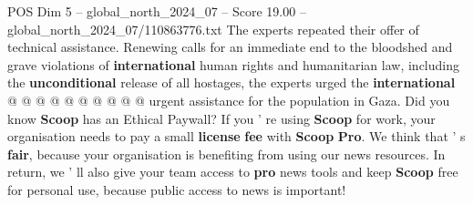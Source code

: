 \begin{textsample}{POS Dim 5 – global\_north\_2024\_07 – Score 19.00 – global\_north\_2024\_07/110863776.txt}
The experts repeated their offer of technical assistance.
Renewing calls for an immediate end to the bloodshed and grave violations of \textbf{international} human rights and humanitarian law, including the \textbf{unconditional} release of all hostages, the experts urged the \textbf{international} @ @ @ @ @ @ @ @ @ @ urgent assistance for the population in Gaza.
Did you know \textbf{Scoop} has an Ethical Paywall?
If you ' re using \textbf{Scoop} for work, your organisation needs to pay a small \textbf{license} \textbf{fee} with \textbf{Scoop} \textbf{Pro}.
We think that ' s \textbf{fair}, because your organisation is benefiting from using our news resources.
In return, we ' ll also give your team access to \textbf{pro} news tools and keep \textbf{Scoop} free for personal use, because public access to news is important!

\end{textsample}
